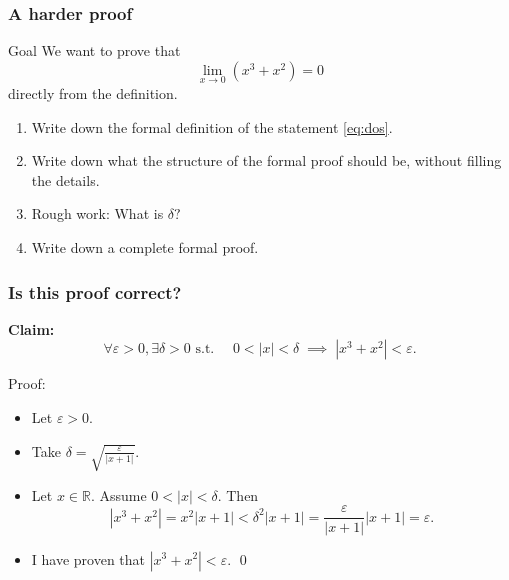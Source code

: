 \documentclass[14pt]{beamer}
\begin{document}
\begin{frame}
	\frametitle{A harder proof}

	\begin{block}{Goal}
		We want to prove that
		\begin{equation}
			\label{eq:dos}\lim_{x \to 0}\left( x^{3}+ x^{2}\right) = 0
		\end{equation}
		directly from the definition.
	\end{block}
	\vfill
	\begin{enumerate}

		\item Write down the formal definition of the statement \eqref{eq:dos}.

		\item Write down what the structure of the formal proof should be, without
			filling the details.

		\item Rough work: What is $\delta?$

		\item Write down a complete formal proof.
	\end{enumerate}
	\vfill
\end{frame}

\begin{frame}[t]
	\frametitle{Is this proof correct?}

	{\bfseries Claim:}
	\[
		\forall \varepsilon >0, \exists \delta>0 \text{ s.t. }\quad 0<|x|<\delta \; \implies
		\; |x^{3}+x^{2}| < \varepsilon.
	\]
	\vfill
	\begin{block}{Proof:}
		\begin{itemize}
			\item Let $\varepsilon >0$.

			\item Take $\displaystyle \delta = \sqrt{\frac{\varepsilon}{|x+1|}}$.

			\item Let $x \in \mathbb{R}$. Assume $0 < |x| < \delta$. Then
				\[
					|x^{3}+x^{2}| = x^{2}| x + 1| < \delta^{2}|x+1| = \frac{\varepsilon}{|x+1|}
					|x+1| = \varepsilon.
				\]

			\item I have proven that $\displaystyle |x^{3}+x^{2}| < \varepsilon$.
				\hfill \qed
		\end{itemize}
	\end{block}

	\vfill
\end{frame}
\end{document}
